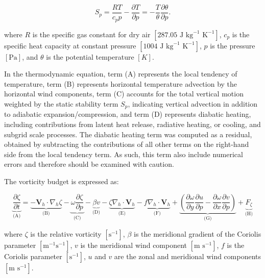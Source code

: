\documentclass[pdflatex,sn-chicago]{sn-jnl}%
\theoremstyle{plain}
\theoremstyle{definition}
\theoremstyle{remark}
\theoremstyle{definition}
\begin{document}
\begin{equation}
S_p = \frac{R T}{c_p p} - \frac{\partial T}{\partial p} = - \frac{T}{\theta} \frac{\partial \theta}{\partial p}.
\end{equation}

where \(R\) is the specific gas constant for dry air \([287.05 \text{ J kg}^{-1} \text{ K}^{-1}]\), \(c_p\) is the specific heat capacity at constant pressure \([1004 \text{ J kg}^{-1} \text{ K}^{-1}]\), \(p\) is the pressure \([\text{Pa}]\), and \(\theta\) is the potential temperature \([K]\). 

In the thermodynamic equation, term (A) represents the local tendency of temperature, term (B) represents horizontal temperature advection by the horizontal wind components, term (C) accounts for the total vertical motion weighted by the static stability term \(S_p\), indicating vertical advection in addition to adiabatic expansion/compression, and term (D) represents diabatic heating, including contributions from latent heat release, radiative heating, or cooling, and subgrid scale processes. The diabatic heating term was computed as a residual, obtained by subtracting the contributions of all other terms on the right-hand side from the local tendency term. As such, this term also include numerical errors and therefore should be examined with caution.

The vorticity budget is expressed as:

\begin{equation}
\underbrace{\frac{\partial \zeta}{\partial t}}_{\text{(A)}} = 
\underbrace{-\mathbf{V}_h \cdot \nabla_h \zeta}_{\text{(B)}} 
- \underbrace{ \omega \frac{\partial \zeta}{\partial p}}_{\text{(C)}} 
- \underbrace{ \beta v}_{\text{(D)}} 
- \underbrace{ \zeta \nabla_{h} \cdot \mathbf{V}_h}_{\text{(E)}} 
- \underbrace{ f \nabla_{h} \cdot \mathbf{V}_h}_{\text{(F)}} 
+ \underbrace{\left( \frac{\partial \omega}{\partial y} \frac{\partial u}{\partial p} - \frac{\partial \omega}{\partial x} \frac{\partial v}{\partial p} \right)}_{\text{(G)}} 
+ \underbrace{F_\zeta}_{\text{(H)}}
\end{equation}

where \(\zeta\) is the relative vorticity \([\text{s}^{-1}]\), \(\beta\) is the meridional gradient of the Coriolis parameter \([\text{m}^{-1}\text{s}^{-1}]\), \(v\) is the meridional wind component \([\text{m s}^{-1}]\), \(f\) is the Coriolis parameter \([\text{s}^{-1}]\), \(u\) and \(v\) are the zonal and meridional wind components \([\text{m s}^{-1}]\).
\end{document}
